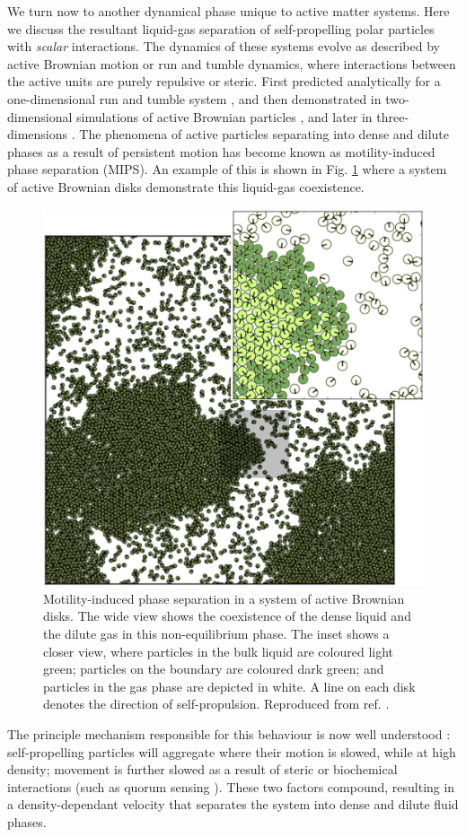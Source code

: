 We turn now to another dynamical phase unique to active matter systems. Here we discuss the resultant liquid-gas separation of self-propelling polar particles with \textit{scalar} interactions. The dynamics of these systems evolve as described by active Brownian motion or run and tumble dynamics, where interactions between the active units are purely repulsive or steric. First predicted analytically for a one-dimensional run and tumble system \cite{tailleur2008}, and then demonstrated in two-dimensional simulations of active Brownian particles \cite{fily2012, redner2013}, and later in three-dimensions \cite{stenhammar2014,wysocki2014}. The phenomena of active particles separating into dense and dilute phases as a result of persistent motion has become known as motility-induced phase separation (MIPS). An example of this is shown in Fig. \ref{fig:MIPS} where a system of  active Brownian disks demonstrate this liquid-gas coexistence.  
\begin{figure}
	\includegraphics[width=0.5\linewidth]{chapters/activeMatter/figsActiveMatter/figMIPS}
	\centering
	\caption[Motility induced phase separation]{Motility-induced phase separation in a system of active Brownian disks. The wide view shows the coexistence of the dense liquid and the dilute gas in this non-equilibrium phase. The inset shows a closer view, where particles in the bulk liquid are coloured light green; particles on the boundary are coloured dark green; and particles in the gas phase are depicted in white. A line on each disk denotes the direction of self-propulsion. Reproduced from  ref. \cite{marchetti2016}.}
	\label{fig:MIPS}	
\end{figure}
The principle mechanism responsible for this behaviour is now well understood \cite{cates2015}: self-propelling particles will aggregate where their motion is slowed, while at high density; movement is further slowed as a result of steric or biochemical interactions (such as quorum sensing \cite{miller2001}). These two factors compound, resulting in a density-dependant velocity that separates the system into dense and dilute fluid phases.





